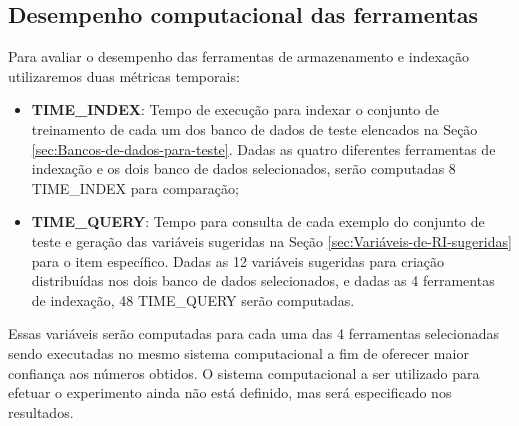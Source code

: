     \subsection{Desempenho computacional das ferramentas}  \label{sec:Desempenho-computacional}
        Para avaliar o desempenho das ferramentas de armazenamento e indexação utilizaremos duas métricas temporais:
        \begin{itemize}
            \item \textbf{TIME\_INDEX}: Tempo de execução para indexar o conjunto de treinamento de cada um dos banco de dados de teste elencados na Seção \ref{sec:Bancos-de-dados-para-teste}. Dadas as quatro diferentes ferramentas de indexação e os dois banco de dados selecionados, serão computadas 8 TIME\_INDEX para comparação;
            
            \item \textbf{TIME\_QUERY}: Tempo para consulta de cada exemplo do conjunto de teste e geração das variáveis sugeridas na Seção \ref{sec:Variáveis-de-RI-sugeridas} para o item específico. Dadas as 12 variáveis sugeridas para criação distribuídas nos dois banco de dados selecionados, e dadas as 4 ferramentas de indexação, 48 TIME\_QUERY serão computadas.  
        \end{itemize}
        
        Essas variáveis serão computadas para cada uma das 4 ferramentas selecionadas sendo executadas no mesmo sistema computacional a fim de oferecer maior confiança aos números obtidos. 
        O sistema computacional a ser utilizado para efetuar o experimento ainda não está definido, mas será especificado nos resultados.
    

